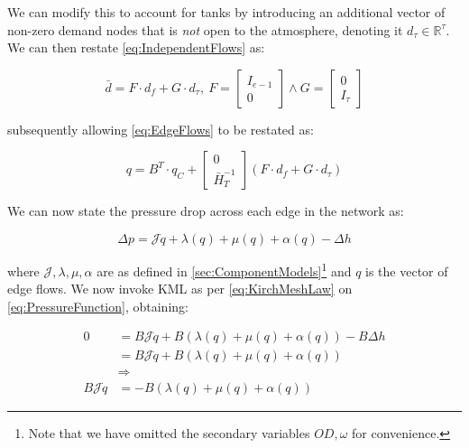 We can modify this to account for tanks by introducing an additional vector of non-zero demand nodes that is \textit{not} open to the atmosphere, denoting it $d_{\tau} \in \mathbb{R}^{\tau}$. We can then restate \cref{eq:IndependentFlows} as:

\begin{equation}\label{eq:IndependentFlowsWithTank}
	\bar{d} = F\cdot d_f + G \cdot d_{\tau}, 
	\ F = \begin{bmatrix}
		I_{e-1} \\ 0
	\end{bmatrix} 
	\wedge 
	G = \begin{bmatrix}
	0 \\ I_{\tau}
	\end{bmatrix}
\end{equation}

subsequently allowing \cref{eq:EdgeFlows} to be restated as:

\begin{equation}\label{eq:EdgeFlowsWithTank}
	q = B^T\cdot q_C +
	\begin{bmatrix} 0 \\ \bar{H}_T^{-1} \end{bmatrix} (F \cdot d_f + G \cdot d_{\tau})
\end{equation}

We can now state the pressure drop across each edge in the network as:

\begin{equation}\label{eq:PressureFunction}
	\Delta p = \mathcal{J}\dot{q} + \lambda(q) + \mu(q) + \alpha(q) -\Delta h
\end{equation}

where $\mathcal{J}, \lambda, \mu, \alpha$ are as defined in \cref{sec:ComponentModels}\footnote{Note that we have omitted the secondary variables $OD,\omega$ for convenience.} and $q$ is the vector of edge flows. We now invoke KML as per \cref{eq:KirchMeshLaw} on \cref{eq:PressureFunction}, obtaining:

\begin{equation}\label{eq:PressureFunctionKirch}
	\begin{split}
			0 &= B\mathcal{J}\dot{q} + B(\lambda(q) + \mu(q) + \alpha(q)) -B\Delta h \\
			&= B\mathcal{J}\dot{q} + B(\lambda(q) + \mu(q) + \alpha(q)) \\
			&\Rightarrow \\
			B\mathcal{J}\dot{q} &= -B(\lambda(q) + \mu(q) + \alpha(q))
	\end{split}
\end{equation}

